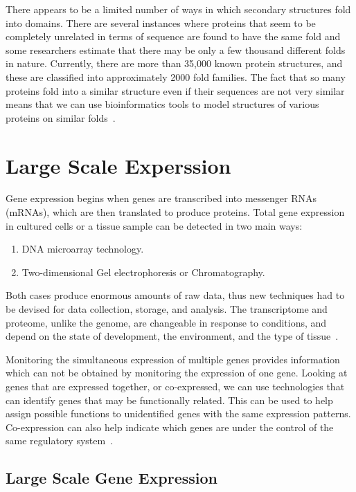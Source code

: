 \documentclass{report}
\begin{document}
There appears to be a limited number of ways in which secondary structures fold into domains. There are several instances where proteins that seem to be completely unrelated in terms of sequence are found to have the same fold and some researchers estimate that there may be only a few thousand different folds in nature. Currently, there are more than 35,000 known protein structures, and these are classified into approximately 2000 fold families. The fact that so many proteins fold into a similar structure even if their sequences are not very similar means that we can use bioinformatics tools to model structures of various proteins on similar folds~\cite{zvelebil_understanding_2008}.

\section{Large Scale Experssion}

Gene expression begins when genes are transcribed into messenger RNAs (mRNAs), which are then translated to produce proteins. Total gene expression in cultured cells or a tissue sample can be detected in two main ways:

\begin{enumerate}
    \item DNA microarray technology.
    \item Two-dimensional Gel electrophoresis or Chromatography.
\end{enumerate}

Both cases produce enormous amounts of raw data, thus new techniques had to be devised for data collection, storage, and analysis. The transcriptome and proteome, unlike the genome, are changeable in response to conditions, and depend on the state of development, the environment, and the type of tissue~\cite{zvelebil_understanding_2008}.

Monitoring the simultaneous expression of multiple genes provides information which can not be obtained by monitoring the expression of one gene. Looking at genes that are expressed together, or co-expressed, we can use technologies that can identify genes that may be functionally related. This can be used to help assign possible functions to unidentified genes with the same expression patterns. Co-expression can also help indicate which genes are under the control of the same regulatory system~\cite{zvelebil_understanding_2008}.


\subsection{Large Scale Gene Expression}
\end{document}
